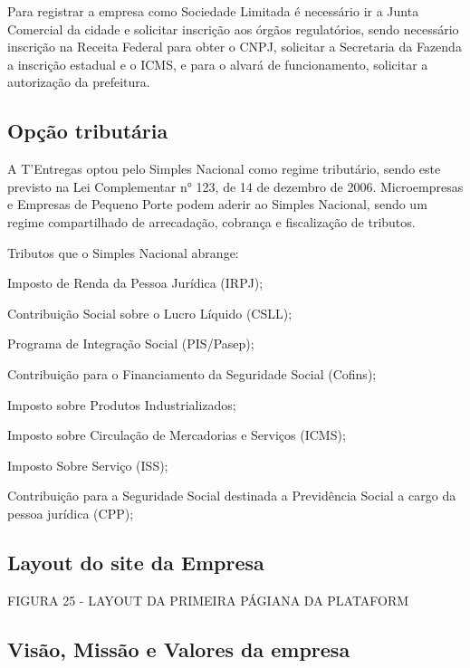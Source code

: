Para registrar a empresa como Sociedade Limitada é necessário ir a Junta Comercial da cidade e solicitar inscrição aos órgãos regulatórios, sendo necessário inscrição na Receita Federal para obter o CNPJ, solicitar a Secretaria da Fazenda a inscrição estadual e o ICMS, e para o alvará de funcionamento, solicitar a autorização da prefeitura.\par

\subsection{Opção tributária}

A T'Entregas optou pelo Simples Nacional como regime tributário, sendo este previsto na Lei Complementar n° 123, de 14 de dezembro de 2006. Microempresas e Empresas de Pequeno Porte podem aderir ao Simples Nacional, sendo um regime compartilhado de arrecadação, cobrança e fiscalização de tributos. \par
Tributos que o Simples Nacional abrange: \par
Imposto de Renda da Pessoa Jurídica (IRPJ); \par
Contribuição Social sobre o Lucro Líquido (CSLL); \par
Programa de Integração Social (PIS/Pasep); \par
Contribuição para o Financiamento da Seguridade Social (Cofins); \par
Imposto sobre Produtos Industrializados; \par
Imposto sobre Circulação de Mercadorias e Serviços (ICMS); \par
Imposto Sobre Serviço (ISS); \par
Contribuição para a Seguridade Social destinada a Previdência Social a 
cargo da pessoa jurídica (CPP); \par

\subsection{Layout do site da Empresa}

\begin{commentB}
	FIGURA 25 - LAYOUT DA PRIMEIRA PÁGIANA DA PLATAFORM
	\par \end{commentB}

\subsection{Visão, Missão e Valores da empresa}

